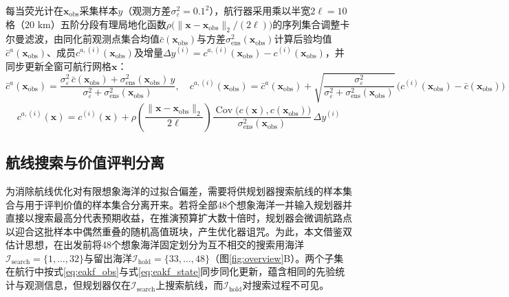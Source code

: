 每当荧光计在$\mathbf{x}_{\text{obs}}$采集样本$y$（观测方差$\sigma_{\varepsilon}^2 = 0.1^2$），航行器采用乘以半宽$2\ell = 10$格（$20\text{ km}$）五阶分段有理局地化函数$\rho\!\big(\|\mathbf{x}-\mathbf{x}_{\text{obs}}\|_2 / (2\ell)\big)$\cite{gaspari1999correlation}的序列集合调整卡尔曼滤波\cite{anderson2001eakf}，由同化前观测点集合均值$\bar{c}(\mathbf{x}_{\text{obs}})$与方差$\sigma_{\text{ens}}^2(\mathbf{x}_{\text{obs}})$计算后验均值$\bar{c}^a(\mathbf{x}_{\text{obs}})$、成员$c^{a,(i)}(\mathbf{x}_{\text{obs}})$及增量$\Delta y^{(i)} = c^{a,(i)}(\mathbf{x}_{\text{obs}}) - c^{(i)}(\mathbf{x}_{\text{obs}})$，并同步更新全窗可航行网格$\mathbf{x}$：
\begin{equation}
  \bar{c}^a(\mathbf{x}_{\text{obs}}) = \frac{\sigma_{\varepsilon}^2\,\bar{c}(\mathbf{x}_{\text{obs}}) + \sigma_{\text{ens}}^2(\mathbf{x}_{\text{obs}})\,y}{\sigma_{\varepsilon}^2 + \sigma_{\text{ens}}^2(\mathbf{x}_{\text{obs}})}, \quad
  c^{a,(i)}(\mathbf{x}_{\text{obs}}) = \bar{c}^a(\mathbf{x}_{\text{obs}}) + \sqrt{\frac{\sigma_{\varepsilon}^2}{\sigma_{\varepsilon}^2 + \sigma_{\text{ens}}^2(\mathbf{x}_{\text{obs}})}}\,\Big(c^{(i)}(\mathbf{x}_{\text{obs}}) - \bar{c}(\mathbf{x}_{\text{obs}})\Big)
  \label{eq:eakf_obs}
\end{equation}
\begin{equation}
  c^{a,(i)}(\mathbf{x}) = c^{(i)}(\mathbf{x}) + \rho\!\left(\frac{\|\mathbf{x}-\mathbf{x}_{\text{obs}}\|_2}{2\ell}\right)\frac{\operatorname{Cov}\!\big(c(\mathbf{x}), c(\mathbf{x}_{\text{obs}})\big)}{\sigma_{\text{ens}}^2(\mathbf{x}_{\text{obs}})}\,\Delta y^{(i)}
  \label{eq:eakf_state}
\end{equation}

\subsection{航线搜索与价值评判分离}

为消除航线优化对有限想象海洋的过拟合偏差，需要将供规划器搜索航线的样本集合与用于评判价值的样本集合分离开来。若将全部48个想象海洋一并输入规划器并直接以搜索最高分代表预期收益\cite{russell1991right, lin2015metareasoning}，在推演预算扩大数十倍时，规划器会微调航路点以迎合这批样本中偶然重叠的随机高值斑块，产生优化器诅咒\cite{smith2006curse}。为此，本文借鉴双估计思想\cite{vanhasselt2010double}，在出发前将48个想象海洋固定划分为互不相交的搜索用海洋$\mathcal{I}_{\text{search}} = \{1, \dots, 32\}$与留出海洋$\mathcal{I}_{\text{hold}} = \{33, \dots, 48\}$（图\ref{fig:overview}B）。两个子集在航行中按式\eqref{eq:eakf_obs}与式\eqref{eq:eakf_state}同步同化更新，蕴含相同的先验统计与观测信息，但规划器仅在$\mathcal{I}_{\text{search}}$上搜索航线，而$\mathcal{I}_{\text{hold}}$对搜索过程不可见。

